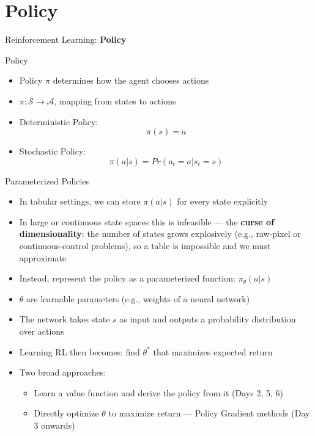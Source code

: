 \section{Policy}
\begin{frame}{}
    \LARGE Reinforcement Learning: \textbf{Policy}
\end{frame}

\begin{frame}{Policy}
\begin{itemize}
    \item Policy $\pi$ determines how the agent chooses actions
    \item $\pi : \mathcal{S} \rightarrow \mathcal{A}$, mapping from states to actions
    \item Deterministic Policy: $$\pi(s) = a$$
    \item Stochastic Policy: $$\pi(a|s) = Pr(a_t = a | s_t = s)$$
\end{itemize}
    
\end{frame}

\begin{frame}{Parameterized Policies}
\begin{itemize}
    \item In tabular settings, we can store $\pi(a|s)$ for every state explicitly
    \item In large or continuous state spaces this is infeasible --- the \textbf{curse of dimensionality}: the number of states grows explosively (e.g., raw-pixel or continuous-control problems), so a table is impossible and we must approximate
    \item Instead, represent the policy as a parameterized function: $\pi_\theta(a|s)$
    \item $\theta$ are learnable parameters (e.g., weights of a neural network)
    \item The network takes state $s$ as input and outputs a probability distribution over actions
    \item Learning RL then becomes: find $\theta^*$ that maximizes expected return
    \item Two broad approaches:
    \begin{itemize}
        \item Learn a value function and derive the policy from it (Days 2, 5, 6)
        \item Directly optimize $\theta$ to maximize return --- Policy Gradient methods (Day 3 onwards)
    \end{itemize}
\end{itemize}
\end{frame}